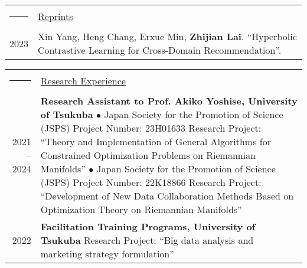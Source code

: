 \documentclass[a4paper,10pt]{article}
\newcommand{\headingfont}{\LARGE \MakeUppercase }
\newenvironment{SectionTable}[1]{
	\renewcommand*{\arraystretch}{1.0}
	\setlength{\tabcolsep}{10pt}
	\begin{longtable}{Rp{5.2in}} 
		\rule{2.3cm}{4pt} 
		& \underline{#1} \\ %
	}
	{
	\end{longtable}\vspace{-.3cm}
}
\begin{document}
\begin{SectionTable}{\headingfont Reprints} 
	2023 & 
	Xin Yang, Heng Chang, Erxue Min, \textbf{Zhijian Lai}.
	``Hyperbolic Contrastive Learning for Cross-Domain Recommendation''. \\
	
%	
\end{SectionTable}
	
\begin{SectionTable}{\headingfont Research Experience}
	2021 -- 2024 & 
	\textbf{Research Assistant to Prof. Akiko Yoshise, University of Tsukuba} \newline
	$\bullet$ Japan Society for the Promotion of Science (JSPS) 
	Project Number: 23H01633 \newline
	Research Project: ``{Theory and Implementation of General Algorithms for Constrained Optimization Problems on Riemannian Manifolds}'' \newline
	$\bullet$ Japan Society for the Promotion of Science (JSPS) 
	Project Number: 22K18866 \newline
	Research Project: ``{Development of New Data Collaboration Methods Based on Optimization Theory on Riemannian Manifolds}'' \\
	
	2022 &
	\textbf{Facilitation Training Programs, University of Tsukuba}
	\newline
	Research Project: ``{Big data analysis and marketing strategy formulation}''
	\newline
\end{SectionTable}
\end{document}

